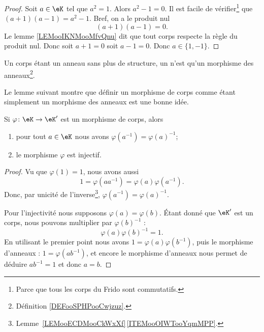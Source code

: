 \begin{proof}
	Soit \( a\in \eK\) tel que \( a^2=1\). Alors \( a^2-1=0\). Il est facile de vérifier\footnote{Parce que tous les corps du Frido sont commutatifs.} que \( (a+1)(a-1)=a^2-1\). Bref, on a le produit nul
	\begin{equation}
		(a+1)(a-1)=0.
	\end{equation}
	Le lemme \ref{LEMooIKNMooMfvQnu} dit que tout corps respecte la règle du produit nul. Donc soit \( a+1=0\) soit \( a-1=0\). Donc \( a\in\{ 1,-1 \}\).
\end{proof}

\begin{definition}		\label{DEFooWGKFooJaakjf}
	Un corps étant un anneau sans plus de structure, un  n'est qu'un morphisme des anneaux\footnote{Définition \ref{DEFooSPHPooCwjzuz}.}.
\end{definition}

Le lemme suivant montre que définir un morphisme de corps comme étant simplement un morphisme des anneaux est une bonne idée.
\begin{lemma}       \label{LEMooWBOPooZnsZgQ}
	Si \( \varphi\colon \eK\to \eK'\) est un morphisme de corps, alors
	\begin{enumerate}
		\item
		      pour tout \( a\in \eK\) nous avons \( \varphi(a^{-1})=\varphi(a)^{-1}\);
		\item
		      le morphisme \( \varphi\) est injectif.
	\end{enumerate}
\end{lemma}

\begin{proof}
	Vu que \( \varphi(1)=1\), nous avons aussi
	\begin{equation}
		1=\varphi(aa^{-1})=\varphi(a)\varphi(a^{-1}).
	\end{equation}
	Donc, par unicité de l'inverse\footnote{Lemme~\ref{LEMooECDMooCkWxXf}\,\ref{ITEMooOIWTooYqmMPP}.}, \( \varphi(a^{-1})=\varphi(a)^{-1}\).

	Pour l'injectivité nous supposons \( \varphi(a)=\varphi(b)\). Étant donné que \( \eK'\) est un corps, nous pouvons multiplier par \( \varphi(b)^{-1}\) :
	\begin{equation}
		\varphi(a)\varphi(b)^{-1}=1.
	\end{equation}
	En utilisant le premier point nous avons \( 1=\varphi(a)\varphi(b^{-1})\), puis le morphisme d'anneaux : \( 1=\varphi(ab^{-1})\), et encore le morphisme d'anneaux nous permet de déduire \( ab^{-1}=1\) et donc \(a=b\).
\end{proof}




